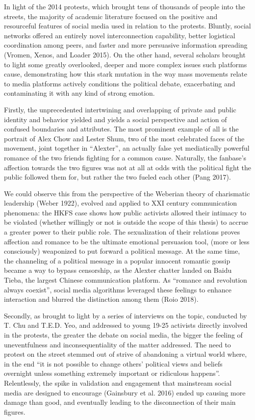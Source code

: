 \documentclass[
  a4paper,
]{book}
\begin{document}
In light of the 2014 protests, which brought tens of thousands of people into the streets, the majority of academic literature focused on the positive and resourceful features of social media used in relation to the protests. Bluntly, social networks offered an entirely novel interconnection capability, better logistical coordination among peers, and faster and more persuasive information spreading {(Vromen, Xenos, and Loader 2015)}. On the other hand, several scholars brought to light some greatly overlooked, deeper and more complex issues such platforms cause, demonstrating how this stark mutation in the way mass movements relate to media platforms actively conditions the political debate, exacerbating and contaminating it with any kind of strong emotion.

Firstly, the unprecedented intertwining and overlapping of private and public identity and behavior yielded and yields a social perspective and action of confused boundaries and attributes. The most prominent example of all is the portrait of Alex Chow and Lester Shum, two of the most celebrated faces of the movement, joint together in ``Alexter'', an actually false yet mediatically powerful romance of the two friends fighting for a common cause. Naturally, the fanbase's affection towards the two figures was not at all at odds with the political fight the public followed them for, but rather the two fueled each other {(Pang 2017)}.

We could observe this from the perspective of the Weberian theory of charismatic leadership {(Weber 1922)}, evolved and applied to XXI century communication phenomena: the HKFS case shows how public activists allowed their intimacy to be violated (whether willingly or not is outside the scope of this thesis) to accrue a greater power to their public role. The sexualization of their relations proves affection and romance to be the ultimate emotional persuasion tool, (more or less consciously) weaponized to put forward a political message. At the same time, the channeling of a political message in a popular innocent romantic gossip became a way to bypass censorship, as the Alexter chatter landed on Baidu Tieba, the largest Chinese communication platform. As ``romance and revolution always coexist'', social media algorithms leveraged these feelings to enhance interaction and blurred the distinction among them {(Roio 2018)}.

Secondly, as brought to light by a series of interviews on the topic, conducted by T. Chu and T.E.D. Yeo, and addressed to young 19-25 activists directly involved in the protests, the greater the debate on social media, the bigger the feeling of uneventfulness and inconsequentiality of the matter addressed. The need to protest on the street stemmed out of strive of abandoning a virtual world where, in the end ``it is not possible to change others' political views and beliefs overnight unless something extremely important or ridiculous happens''. Relentlessly, the spike in validation and engagement that mainstream social media are designed to encourage {(Gainsbury et al. 2016)} ended up causing more damage than good, and eventually leading to the disconnection of their main figures.
\end{document}
